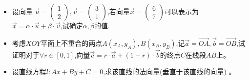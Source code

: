 \documentclass[UTF8]{article}
\begin{document}
\begin{itemize}
	\item 设向量
$\vec{u} = 
\left(
\begin{array}{l}
1\\
2
\end{array}
\right), \vec{v} = 
\left(
\begin{array}{l}
3\\
1
\end{array}
\right)$,若向量$\vec{x} = \left(
\begin{array}{l}
6\\
7
\end{array}
\right)$可以表示为$\vec{x} = \alpha\cdot\vec{u} + \beta\cdot\vec{v}$,试确定$\alpha, \beta$的值.
	\item 考虑$XOY$平面上不重合的两点$A(x_A, y_A), B(x_B, y_B)$,记$\vec{a} = \overrightarrow{OA}, \vec{b} = \overrightarrow{OB}$,试证明对于$\forall  r \in [0, 1]$,向量$\vec{c} = r \cdot \vec{a} + (1 - r)\cdot \vec{b}$的终点$C$在线段$AB$上。
	\item 设直线方程$l: Ax + By + C = 0$,求该直线的法向量(垂直于该直线的向量) 。
	
\end{itemize}
\end{document}
